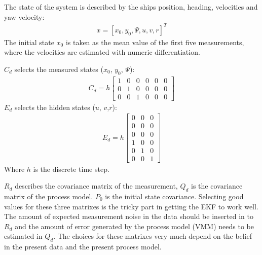 \documentclass[review]{elsarticle}
\begin{document}
\sphinxAtStartPar
The state of the system is described by the ships position, heading, velocities and yaw velocity:
\begin{equation}\label{equation:04.01_EK:eqstates}
\begin{split}x = [x_0,y_0,\Psi,u,v,r]^T\end{split}
\end{equation}
\sphinxAtStartPar
The initial state \(x_0\) is taken as the mean value of the first five measurements, where the velocities are estimated with numeric differentiation.

\sphinxAtStartPar
\(C_d\) selects the measured states (\(x_0\), \(y_0\), \(\Psi\)):
\begin{equation}\label{equation:04.01_EK:eqcd}
\begin{split}\displaystyle C_{d} = h \left[\begin{matrix}1 & 0 & 0 & 0 & 0 & 0\\0 & 1 & 0 & 0 & 0 & 0\\0 & 0 & 1 & 0 & 0 & 0\end{matrix}\right]\end{split}
\end{equation}
\sphinxAtStartPar
\(E_d\) selects the hidden states (\(u\), \(v\),\(r\)):
\begin{equation}\label{equation:04.01_EK:eqed}
\begin{split}\displaystyle E_{d} = h \left[\begin{matrix}0 & 0 & 0\\0 & 0 & 0\\0 & 0 & 0\\1 & 0 & 0\\0 & 1 & 0\\0 & 0 & 1\end{matrix}\right]\end{split}
\end{equation}
\sphinxAtStartPar
Where \(h\) is the discrete time step.

\sphinxAtStartPar
\(R_d\) describes the covariance matrix of the measurement, \(Q_d\) is the covariance matrix of the process model. \(P_0\) is the initial state covariance.
Selecting good values for these three matrixes is the tricky part in getting the EKF to work well. The amount of expected measurement noise in the data should be inserted in to \(R_d\) and the amount of error generated by the process model (VMM) needs to be estimated in \(Q_d\). The choices for these matrixes very much depend on the belief in the present data and the present process model.
\end{document}
